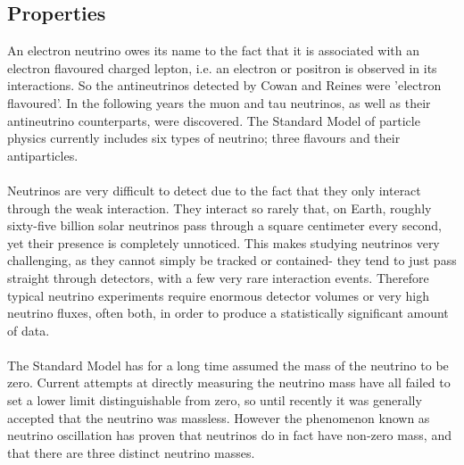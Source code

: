 \documentclass[12pt]{article}
\begin{document}
\subsection{Properties}
An electron neutrino owes its name to the fact that it is associated with an electron flavoured charged lepton, i.e. an electron or positron is observed in its interactions. So the antineutrinos detected by Cowan and Reines were 'electron flavoured'. In the following years the muon and tau neutrinos, as well as their antineutrino counterparts, were discovered. The Standard Model of particle physics currently includes six types of neutrino; three flavours and their antiparticles.\\\\
Neutrinos are very difficult to detect due to the fact that they only interact through the weak interaction. They interact so rarely that, on Earth, roughly sixty-five billion solar neutrinos pass through a square centimeter every second\cite{PDG}, yet their presence is completely unnoticed. This makes studying neutrinos very challenging, as they cannot simply be tracked or contained- they tend to just pass straight through detectors, with a few very rare interaction events. Therefore typical neutrino experiments require enormous detector volumes or very high neutrino fluxes, often both, in order to produce a statistically significant amount of data.\\\\
The Standard Model has for a long time assumed the mass of the neutrino to be zero. Current attempts at directly measuring the neutrino mass have all failed to set a lower limit distinguishable from zero, so until recently it was generally accepted that the neutrino was massless. However the phenomenon known as neutrino oscillation has proven that neutrinos do in fact have non-zero mass, and that there are three distinct neutrino masses.\\\\
\end{document}

